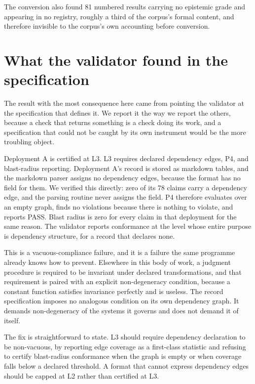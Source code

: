 \documentclass[journal]{IEEEtran}
\begin{document}
The conversion also found 81 numbered results carrying no epistemic grade and
appearing in no registry, roughly a third of the corpus's formal content, and
therefore invisible to the corpus's own accounting before conversion.

\section{What the validator found in the specification}
\label{sec:selfcheck}

The result with the most consequence here came from pointing the validator at
the specification that defines it. We report it the way we report the others,
because a check that returns something is a check doing its work, and a
specification that could not be caught by its own instrument would be the more
troubling object.

Deployment A is certified at L3. L3 requires declared dependency edges, P4, and
blast-radius reporting. Deployment A's record is stored as markdown tables, and
the markdown parser assigns no dependency edges, because the format has no field
for them. We verified this directly: zero of its 78 claims carry a dependency
edge, and the parsing routine never assigns the field. P4 therefore evaluates
over an empty graph, finds no violations because there is nothing to violate, and
reports PASS. Blast radius is zero for every claim in that deployment for the
same reason. The validator reports conformance at the level whose entire purpose
is dependency structure, for a record that declares none.

This is a vacuous-compliance failure, and it is a failure the same programme
already knows how to prevent. Elsewhere in this body of work, a judgment
procedure is required to be invariant under declared transformations, and that
requirement is paired with an explicit non-degeneracy condition, because a
constant function satisfies invariance perfectly and is useless. The record
specification imposes no analogous condition on its own dependency graph. It
demands non-degeneracy of the systems it governs and does not demand it of
itself.

The fix is straightforward to state. L3 should require dependency declaration to
be non-vacuous, by reporting edge coverage as a first-class statistic and
refusing to certify blast-radius conformance when the graph is empty or when
coverage falls below a declared threshold. A format that cannot express
dependency edges should be capped at L2 rather than certified at L3.
\end{document}
